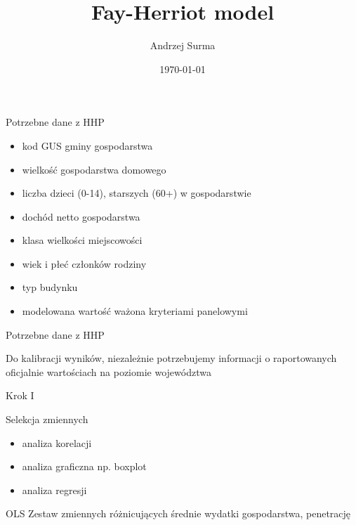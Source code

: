 \documentclass{beamer}
\title{Fay-Herriot model}
\author{Andrzej Surma}
\date{\today}
\begin{document}
	\begin{frame}
		\titlepage
	\end{frame} 
	
	\begin{frame}{Potrzebne dane z HHP}
		\begin{itemize}
			\item{kod GUS gminy gospodarstwa}
			\item{wielkość gospodarstwa domowego}
			\item{liczba dzieci (0-14), starszych (60+) w gospodarstwie}
			\item{dochód netto gospodarstwa}
			\item{klasa wielkości miejscowości}
			\item{wiek i płeć członków rodziny}
			\item{typ budynku}
			\item{modelowana wartość ważona kryteriami panelowymi}
		\end{itemize}
	\end{frame}
	
	\begin{frame}{Potrzebne dane z HHP}
		\begin{block}{}
			Do kalibracji wyników, niezależnie potrzebujemy informacji o raportowanych oficjalnie wartościach na poziomie województwa
		\end{block}
	\end{frame}
	
	\begin{frame}{Krok I}
		\begin{block}{Selekcja zmiennych}
			\begin{itemize}
				\item{analiza korelacji}
				\item{analiza graficzna np. boxplot}
				\item{analiza regresji}
			\end{itemize}
		\end{block}
		\begin{block}{OLS}
			Zestaw zmiennych różnicujących średnie wydatki gospodarstwa, penetrację
		\end{block}
	\end{frame}
	
\end{document}
